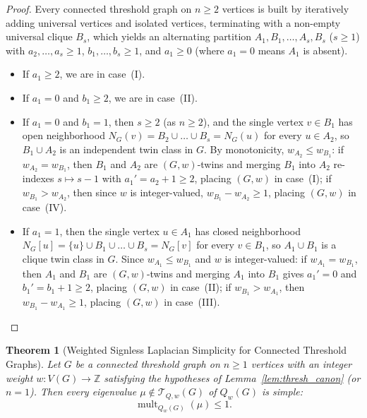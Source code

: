 \documentclass[11pt,a4paper]{article}
\newtheorem{theorem}{Theorem}[section]
\theoremstyle{definition}
\DeclareMathOperator{\mult}{mult}
\begin{document}
\begin{proof}
  Every connected threshold graph on $n \ge 2$ vertices is built by iteratively adding universal vertices and isolated vertices, terminating with a non-empty universal clique $B_s$, which yields an alternating partition $A_1, B_1, \dots, A_s, B_s$ ($s \ge 1$) with $a_2,\dots,a_s \ge 1$, $b_1,\dots,b_s \ge 1$, and $a_1 \ge 0$ (where $a_1 = 0$ means $A_1$ is absent).
  \begin{itemize}
    \item If $a_1 \ge 2$, we are in case~(I).
    \item If $a_1 = 0$ and $b_1 \ge 2$, we are in case~(II).
    \item If $a_1 = 0$ and $b_1 = 1$, then $s \ge 2$ (as $n \ge 2$), and the single vertex $v \in B_1$ has open neighborhood $N_G(v) = B_2 \cup \dots \cup B_s = N_G(u)$ for every $u \in A_2$, so $B_1 \cup A_2$ is an independent twin class in $G$. By monotonicity, $w_{A_2} \le w_{B_1}$: if $w_{A_2} = w_{B_1}$, then $B_1$ and $A_2$ are $(G,w)$-twins and merging $B_1$ into $A_2$ re-indexes $s \mapsto s-1$ with $a_1' = a_2 + 1 \ge 2$, placing $(G,w)$ in case~(I); if $w_{B_1} > w_{A_2}$, then since $w$ is integer-valued, $w_{B_1} - w_{A_2} \ge 1$, placing $(G,w)$ in case~(IV).
    \item If $a_1 = 1$, then the single vertex $u \in A_1$ has closed neighborhood $N_G[u] = \{u\} \cup B_1 \cup \dots \cup B_s = N_G[v]$ for every $v \in B_1$, so $A_1 \cup B_1$ is a clique twin class in $G$. Since $w_{A_1} \le w_{B_1}$ and $w$ is integer-valued: if $w_{A_1} = w_{B_1}$, then $A_1$ and $B_1$ are $(G,w)$-twins and merging $A_1$ into $B_1$ gives $a_1' = 0$ and $b_1' = b_1 + 1 \ge 2$, placing $(G,w)$ in case~(II); if $w_{B_1} > w_{A_1}$, then $w_{B_1} - w_{A_1} \ge 1$, placing $(G,w)$ in case~(III). \qedhere
  \end{itemize}
\end{proof}

\begin{theorem}[Weighted Signless Laplacian Simplicity for Connected Threshold Graphs]\label{thm:Qsimple}
  Let $G$ be a connected threshold graph on $n \ge 1$ vertices with an integer weight $w : V(G) \to \mathbb{Z}$ satisfying the hypotheses of Lemma~\ref{lem:thresh_canon} (or $n = 1$). Then every eigenvalue $\mu \notin \mathcal{T}_{Q,w}(G)$ of $Q_w(G)$ is simple:
  \[
    \mult_{Q_w(G)}(\mu) \le 1.
  \]
\end{theorem}
\end{document}
